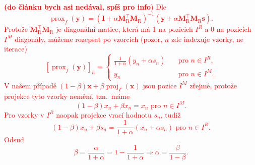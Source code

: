\documentclass[conference]{IEEEtran}
\newcommand{\todo}[1]{\textcolor{red}{#1}}
\begin{document}
\noindent
\todo{\textbf{(do článku bych asi nedával, spíš pro info})}
\todo{%
	Dle \cite[Tab.\,1]{Combettes2011}
	\begin{equation}
		\operatorname{prox}_f(\mathbf{y}) = (\mathbf{I} + \alpha \mathbf{M}_{\mathrm{R}}^\top\mathbf{M}_{\mathrm{R}})^{-1}(\mathbf{y} + \alpha\mathbf{M}_{\mathrm{R}}^\top\mathbf{M}_{\mathrm{R}}\mathbf{s}).
	\end{equation}
	Protože $\mathbf{M}_{\mathrm{R}}^\top\mathbf{M}_{\mathrm{R}}$ je diagonální matice, která má 1 na pozicích $I^R$ a 0 na pozicích $I^M$ diagonály, můžeme rozepsat po vzorcích (pozor, $n$ zde indexuje vzorky, ne iterace)
	\begin{equation}
		\left[\operatorname{prox}_f(\mathbf{y})\right]_n = \begin{cases}
			\frac{1}{1+\alpha}(y_n + \alpha s_n) \quad &\text{pro } n\in I^R, \\
			y_n\quad &\text{pro } n\in I^M. 
		\end{cases}
	\end{equation}
	V našem případě $(1-\beta)\mathbf{x} + \beta \operatorname{proj}_{\Gamma}(\mathbf{x})$ jsou pozice $I^M$ zřejmé, protože projekce tyto vzorky nemění, tzn.\ máme
	\begin{equation}
		(1-\beta) x_n + \beta x_n = x_n \text{ pro } n\in I^M.
	\end{equation}
	Pro vzorky v $I^R$ naopak projekce vrací hodnotu $s_n$, tudíž
	\begin{equation}
		(1-\beta) x_n + \beta s_n = \frac{1}{1+\alpha}(x_n + \alpha s_n)\text{ pro } n\in I^R.
	\end{equation}
	Odsud
	\begin{equation}
		\beta = \frac{\alpha}{1+\alpha} = 1 - \frac{1}{1+\alpha} \Longrightarrow \alpha = \frac{\beta}{1-\beta}.
	\end{equation}
}

%



\end{document}
